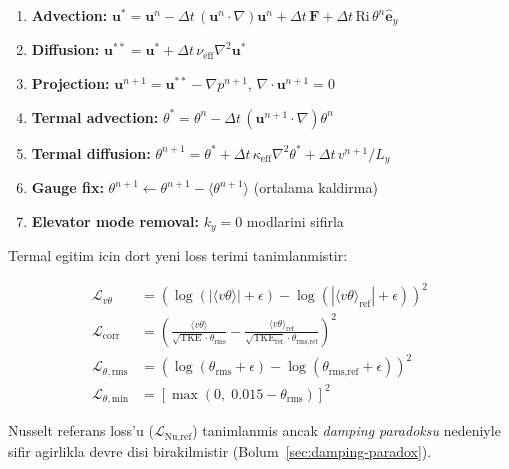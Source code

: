 \begin{enumerate}
  \item \textbf{Advection:} $\mathbf{u}^* = \mathbf{u}^n - \Delta t \,
        (\mathbf{u}^n \cdot \nabla)\mathbf{u}^n + \Delta t\,\mathbf{F}
        + \Delta t\,\text{Ri}\,\theta^n\hat{\mathbf{e}}_y$
  \item \textbf{Diffusion:} $\mathbf{u}^{**} = \mathbf{u}^* + \Delta t\,
        \nu_\text{eff}\nabla^2\mathbf{u}^*$
  \item \textbf{Projection:} $\mathbf{u}^{n+1} = \mathbf{u}^{**} -
        \nabla p^{n+1}$, \quad $\nabla \cdot \mathbf{u}^{n+1} = 0$
  \item \textbf{Termal advection:} $\theta^* = \theta^n - \Delta t\,
        (\mathbf{u}^{n+1} \cdot \nabla)\theta^n$
  \item \textbf{Termal diffusion:} $\theta^{n+1} = \theta^* + \Delta t\,
        \kappa_\text{eff}\nabla^2\theta^* + \Delta t\, v^{n+1}/L_y$
  \item \textbf{Gauge fix:} $\theta^{n+1} \leftarrow \theta^{n+1}
        - \langle\theta^{n+1}\rangle$ (ortalama kaldirma)
  \item \textbf{Elevator mode removal:} $k_y = 0$ modlarini sifirla
\end{enumerate}

Termal egitim icin dort yeni loss terimi tanimlanmistir:

\begin{align}
  \mathcal{L}_{v\theta} &= \left(
    \log(|\langle v\theta\rangle| + \epsilon)
    - \log(|\langle v\theta\rangle_\text{ref}| + \epsilon)
  \right)^2
  \label{eq:loss-vtheta} \\
  \mathcal{L}_\text{corr} &= \left(
    \frac{\langle v\theta\rangle}{\sqrt{\text{TKE}} \cdot \theta_\text{rms}}
    - \frac{\langle v\theta\rangle_\text{ref}}{\sqrt{\text{TKE}_\text{ref}} \cdot \theta_{\text{rms,ref}}}
  \right)^2
  \label{eq:loss-corr} \\
  \mathcal{L}_{\theta,\text{rms}} &= \left(
    \log(\theta_\text{rms} + \epsilon)
    - \log(\theta_{\text{rms,ref}} + \epsilon)
  \right)^2
  \label{eq:loss-theta-rms} \\
  \mathcal{L}_{\theta,\text{min}} &= \left[
    \max(0,\; 0.015 - \theta_\text{rms})
  \right]^2
  \label{eq:loss-theta-min}
\end{align}

\noindent Nusselt referans loss'u ($\mathcal{L}_\text{Nu,ref}$) tanimlanmis
ancak \emph{damping paradoksu} nedeniyle sifir agirlikla devre disi
birakilmistir (Bolum~\ref{sec:damping-paradox}).


